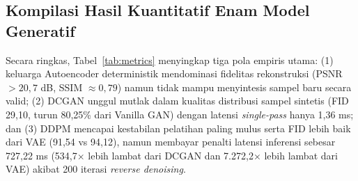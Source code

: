 \documentclass[11pt,a4paper]{article}
\begin{document}
\subsection{Kompilasi Hasil Kuantitatif Enam Model Generatif}

\begin{table}[H]
\centering
\caption{Tabel Komparasi Metrik Numerik Keenam Model Generatif pada Test Set Fashion-MNIST.}
\label{tab:metrics}
\end{table}

Secara ringkas, Tabel~\ref{tab:metrics} menyingkap tiga pola empiris utama: (1) keluarga Autoencoder deterministik mendominasi fidelitas rekonstruksi (PSNR $>20,7$ dB, SSIM $\approx 0,79$) namun tidak mampu menyintesis sampel baru secara valid; (2) DCGAN unggul mutlak dalam kualitas distribusi sampel sintetis (FID 29,10, turun 80,25\% dari Vanilla GAN) dengan latensi \textit{single-pass} hanya 1,36 ms; dan (3) DDPM mencapai kestabilan pelatihan paling mulus serta FID lebih baik dari VAE (91,54 vs 94,12), namun membayar penalti latensi inferensi sebesar 727,22 ms (534,7$\times$ lebih lambat dari DCGAN dan 7.272,2$\times$ lebih lambat dari VAE) akibat 200 iterasi \textit{reverse denoising}.
\end{document}
